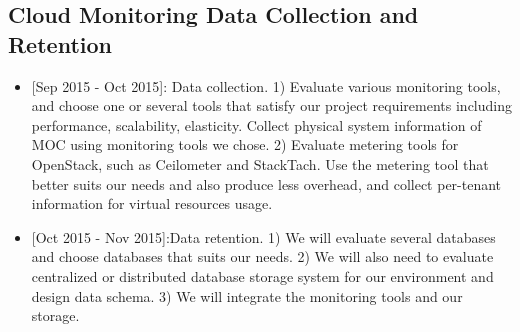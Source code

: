 \subsection{Cloud Monitoring Data Collection and Retention}

\begin{itemize}
\item{[Sep 2015 - Oct 2015]:} Data collection. 1) Evaluate various monitoring tools, and choose one or several tools that satisfy our project requirements including performance, scalability, elasticity. Collect physical system information of MOC using monitoring tools we chose. 2) Evaluate metering tools for OpenStack, such as Ceilometer and StackTach. Use the metering tool that better suits our needs and also produce less overhead, and collect per-tenant information for virtual resources usage. 
\item{[Oct 2015 - Nov 2015]:}Data retention. 1) We will evaluate several databases and choose databases that suits our needs. 2) We will also need to evaluate centralized or distributed database storage system for our environment and design data schema. 3) We will integrate the monitoring tools and our storage.
\end{itemize}